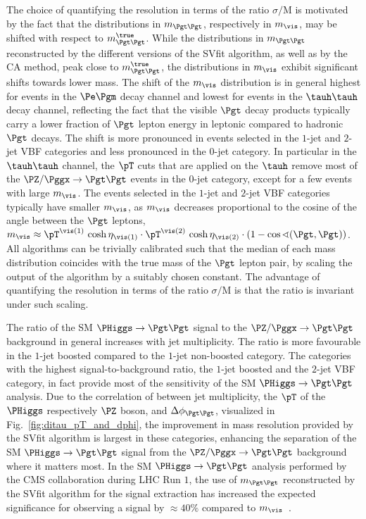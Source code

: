 The choice of quantifying the resolution in terms of the ratio $\sigma/\textrm{M}$ is motivated 
by the fact that the distributions in $m_{\Pgt\Pgt}$, respectively in $m_{\vis}$, may be shifted with respect to $m_{\Pgt\Pgt}^{\true}$.
While the distributions in $m_{\Pgt\Pgt}$ reconstructed by the different versions of the SVfit algorithm,
as well as by the CA method, peak close to $m_{\Pgt\Pgt}^{\true}$,
the distributions in $m_{\vis}$ exhibit significant shifts towards lower mass.
The shift of the $m_{\vis}$ distribution is in general highest for events in the $\Pe\Pgm$ decay channel and lowest for events in the $\tauh\tauh$ decay channel,
reflecting the fact that the visible $\Pgt$ decay products typically carry a lower fraction of $\Pgt$ lepton energy in leptonic compared to hadronic $\Pgt$ decays.
The shift is more pronounced in events selected in the $1$-jet and $2$-jet VBF categories and less pronounced in the $0$-jet category.
In particular in the $\tauh\tauh$ channel,
the $\pT$ cuts that are applied on the $\tauh$ remove most of the $\PZ/\Pggx \to \Pgt\Pgt$ events in the $0$-jet category,
except for a few events with large $m_{\vis}$.
The events selected in the $1$-jet and $2$-jet VBF categories typically have smaller $m_{\vis}$, as $m_{\vis}$ decreases proportional to the cosine of the angle between the $\Pgt$ leptons,
$m_{\vis} \approx \pT^{\vis(1)} \, \cosh\eta_{\vis(1)} \cdot \pT^{\vis(2)} \, \cosh\eta_{\vis(2)} \cdot \left( 1 - \cos\sphericalangle(\Pgt,\Pgt) \right)$.
All algorithms can be trivially calibrated such that the median of each mass distribution coincides with the true mass of the $\Pgt$ lepton pair,
by scaling the output of the algorithm by a suitably chosen constant.
The advantage of quantifying the resolution in terms of the ratio $\sigma/\textrm{M}$ is that the ratio
is invariant under such scaling.

The ratio of the SM $\PHiggs \to \Pgt\Pgt$ signal to the $\PZ/\Pggx \to \Pgt\Pgt$ background in general increases with jet multiplicity.
The ratio is more favourable in the $1$-jet boosted compared to the $1$-jet non-boosted category.
The categories with the highest signal-to-background ratio, the $1$-jet boosted and the $2$-jet VBF category,
in fact provide most of the sensitivity of the SM $\PHiggs \to \Pgt\Pgt$ analysis.
Due to the correlation of between jet multiplicity, the $\pT$ of the $\PHiggs$ respectively $\PZ$ boson, and $\Delta\phi_{\Pgt\Pgt}$,
visualized in Fig.~\ref{fig:ditau_pT_and_dphi}, the improvement in mass resolution provided by the SVfit algorithm is largest in these categories,
enhancing the separation of the SM $\PHiggs \to \Pgt\Pgt$ signal from the $\PZ/\Pggx \to \Pgt\Pgt$ background where it matters most.
In the SM $\PHiggs \to \Pgt\Pgt$ analysis performed by the CMS collaboration during LHC Run $1$,
the use of $m_{\Pgt\Pgt}$ reconstructed by the SVfit algorithm for the signal extraction has increased the expected significance for observing a signal by $\approx 40\%$ compared to $m_{\vis}$~\cite{HIG-13-004}.

